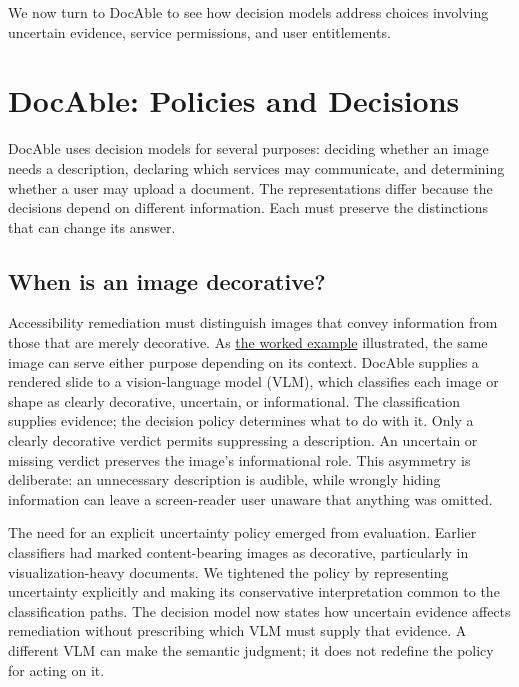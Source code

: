 We now turn to DocAble to see how decision models address choices involving uncertain evidence, service permissions, and user entitlements.

\section{DocAble: Policies and Decisions}\label{heading:docable-policies-and-decisions}

DocAble uses decision models for several purposes: deciding whether an image needs a description, declaring which services may communicate, and determining whether a user may upload a document. The representations differ because the decisions depend on different information. Each must preserve the distinctions that can change its answer.

\subsection{When is an image decorative?}\label{heading:when-is-an-image-decorative}

Accessibility remediation must distinguish images that convey information from those that are merely decorative. As \hyperref[2.5-decision:heading:conditions-alternatives-and-decision-analysis]{the worked example} illustrated, the same image can serve either purpose depending on its context. DocAble supplies a rendered slide to a vision-language model (VLM), which classifies each image or shape as clearly decorative, uncertain, or informational. The classification supplies evidence; the decision policy determines what to do with it. Only a clearly decorative verdict permits suppressing a description. An uncertain or missing verdict preserves the image's informational role. This asymmetry is deliberate: an unnecessary description is audible, while wrongly hiding information can leave a screen-reader user unaware that anything was omitted.

The need for an explicit uncertainty policy emerged from evaluation. Earlier classifiers had marked content-bearing images as decorative, particularly in visualization-heavy documents. We tightened the policy by representing uncertainty explicitly and making its conservative interpretation common to the classification paths. The decision model now states how uncertain evidence affects remediation without prescribing which VLM must supply that evidence. A different VLM can make the semantic judgment; it does not redefine the policy for acting on it.

